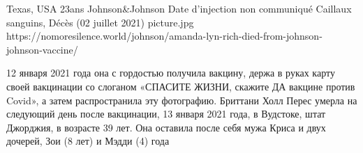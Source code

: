           {Texas, USA}
          {23ans}
          {Johnson\&Johnson}
          {Date d'injection non communiqué}
          {Caillaux sanguins,
          Décès (02 juillet 2021)}
          {picture.jpg}
          {https://nomoresilence.world/johnson/amanda-lyn-rich-died-from-johnson-johnson-vaccine/}
          {

12 января 2021 года она с гордостью получила вакцину, держа в руках карту своей
вакцинации со слоганом «СПАСИТЕ ЖИЗНИ, скажите ДА вакцине против Covid», а затем
распространила эту фотографию. Бриттани Холл Перес умерла на следующий день
после вакцинации, 13 января 2021 года, в Вудстоке, штат Джорджия, в возрасте 39
лет. Она оставила после себя мужа Криса и двух дочерей, Зои (8 лет) и Мэдди (4)
года

}
